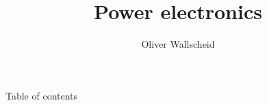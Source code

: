 \documentclass{../course_template/lectureClass}
\title[Power electronics]{Power electronics}
\author{Oliver Wallscheid}
\date{}
\begin{document}

\begin{frame}[plain]
    \titlepage
\end{frame}

\begin{frame}{Table of contents}
    \tableofcontents[hideallsubsections]
\end{frame}


\end{document}
